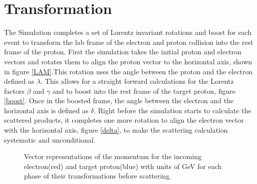 \section{Transformation}
The Simulation completes a set of Lorentz invariant  rotations and boost for each event to transform the lab frame of the electron and proton collision into the rest frame of the proton. First the simulation takes the initial proton and electron vectors and rotates them to align the proton vector to the horizontal axis, shown in figure \ref{LAM}.This rotation uses the angle between the proton and the electron defined as $\lambda$. This allows for a straight forward calculations for the Lorentz factors $\beta$ and $\gamma $ and to boost into the rest frame of the target proton, figure \ref{boost}. Once in the boosted frame, the angle between the electron and the horizontal axis is defined as $\delta$.  Right before the simulation starts to calculate the scattered products, it completes one more rotation to align the electron vector with the horizontal axis, figure \ref{delta}, to make the scattering calculation systematic and unconditional. 

\begin{figure}[h]
  \centering
  
  \quad
  \centering
  \vspace{-2cm}
  \centering
  \quad
  \centering
  
  \caption{Vector representations of the momentum for the incoming electron(red) and  target proton(blue) with units of GeV for each phase of their transformations before scattering.}
  \label{transform}
  \end{figure}
  
